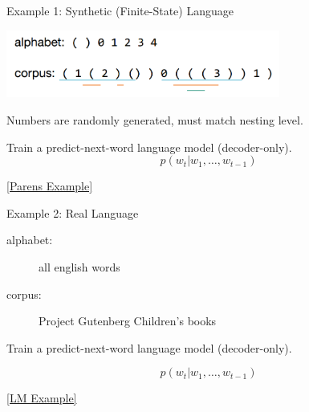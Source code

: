\documentclass{beamer}
\let\tempone\itemize
\let\temptwo\enditemize
\renewenvironment{itemize}{\tempone\addtolength{\itemsep}{0.5\baselineskip}}{\temptwo}
\newcommand{\air}{\vspace{0.25cm}}
\newcommand{\mair}{\vspace{-0.25cm}}
\begin{document}
\begin{frame}
  \centerline{\alert{Example 1}: Synthetic (Finite-State) Language}
  \air

  \begin{center}
    \includegraphics[width=9cm]{parenlang}
  \end{center}
  \mair

  \begin{itemize}
  \item Numbers are randomly generated, must match nesting level.
    \air

  \item Train a predict-next-word language model (decoder-only).
  \end{itemize}
    \[ p(w_t | w_1, \ldots, w_{t-1}) \] 
  
\air
  \centerline{\href{http://lstm.seas.harvard.edu/client/pattern_finder.html?data_set=00parens&source=states::states2&pos=150}{[Parens Example]}}
\end{frame}


\begin{frame}
  \centerline{\alert{Example 2}: Real Language}
  \air

  \begin{description}
  \item[alphabet:] all english words
  \item[corpus:] Project Gutenberg Children's books 
  \end{description}

  \begin{itemize}

  \item Train a predict-next-word language model (decoder-only).

  
  \end{itemize}
    \[ p(w_t | w_1, \ldots, w_{t-1}) \] 

\air
  \centerline{ \href{http://lstm.seas.harvard.edu/client/pattern_finder.html?data_set=05childbook&source=states::states1&pos=100}{[LM Example]}}
\end{frame}
\end{document}
